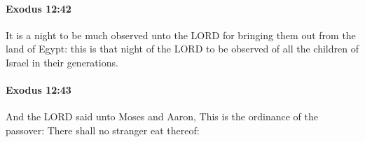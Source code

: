 		\paragraph{Exodus 12:42} %
			\label{EXODUS-12-42}

			It is a night to be much observed unto the LORD for bringing them out from the land of Egypt: this is that night of the LORD to be observed of all the children of Israel in their generations.


		\paragraph{Exodus 12:43} %
			\label{EXODUS-12-43}

			And the LORD said unto Moses and Aaron, This is the ordinance of the passover: There shall no stranger eat thereof:



